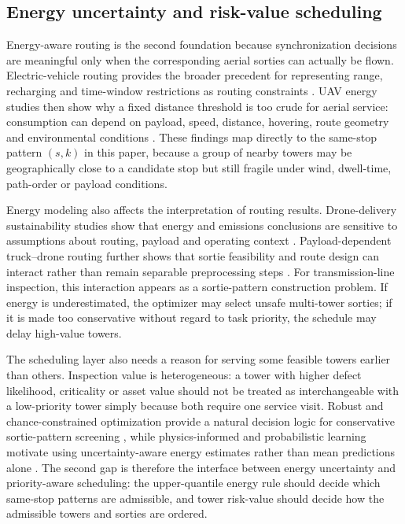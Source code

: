 \subsection{Energy uncertainty and risk-value scheduling}

Energy-aware routing is the second foundation because synchronization decisions are meaningful only when the corresponding aerial sorties can actually be flown. Electric-vehicle routing provides the broader precedent for representing range, recharging and time-window restrictions as routing constraints \citep{schneider2014evrptw,desaulniers2016evrp}. UAV energy studies then show why a fixed distance threshold is too crude for aerial service: consumption can depend on payload, speed, distance, hovering, route geometry and environmental conditions \citep{dorling2017vehicle,dukkanci2021range,zhang2021energyconsumption}. These findings map directly to the same-stop pattern \((s,k)\) in this paper, because a group of nearby towers may be geographically close to a candidate stop but still fragile under wind, dwell-time, path-order or payload conditions.

Energy modeling also affects the interpretation of routing results. Drone-delivery sustainability studies show that energy and emissions conclusions are sensitive to assumptions about routing, payload and operating context \citep{stolaroff2018energy,goodchild2018delivery,figliozzi2017lifecycle}. Payload-dependent truck--drone routing further shows that sortie feasibility and route design can interact rather than remain separable preprocessing steps \citep{jeong2019payloaddrone}. For transmission-line inspection, this interaction appears as a sortie-pattern construction problem. If energy is underestimated, the optimizer may select unsafe multi-tower sorties; if it is made too conservative without regard to task priority, the schedule may delay high-value towers.

The scheduling layer also needs a reason for serving some feasible towers earlier than others. Inspection value is heterogeneous: a tower with higher defect likelihood, criticality or asset value should not be treated as interchangeable with a low-priority tower simply because both require one service visit. Robust and chance-constrained optimization provide a natural decision logic for conservative sortie-pattern screening \citep{bertsimas2004robustness,nemirovski2007chance}, while physics-informed and probabilistic learning motivate using uncertainty-aware energy estimates rather than mean predictions alone \citep{raissi2019pinn,karniadakis2021piml,yang2021bpinn}. The second gap is therefore the interface between energy uncertainty and priority-aware scheduling: the upper-quantile energy rule should decide which same-stop patterns are admissible, and tower risk-value should decide how the admissible towers and sorties are ordered.

